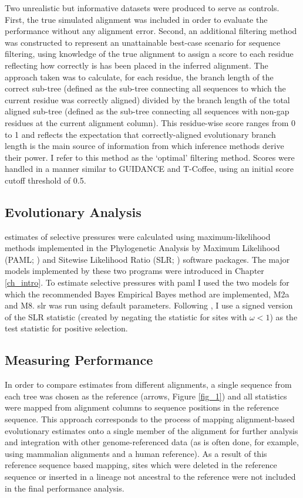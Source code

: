 Two unrealistic but informative datasets were produced to serve as
controls. First, the true simulated alignment was included in order to
evaluate the \sw performance without any alignment error. Second, an
additional filtering method was constructed to represent an
unattainable best-case scenario for sequence filtering, using
knowledge of the true alignment to assign a score to each residue
reflecting how correctly is has been placed in the inferred
alignment. The approach taken was to calculate, for each residue, the
branch length of the correct sub-tree (defined as the sub-tree
connecting all sequences to which the current residue was correctly
aligned) divided by the branch length of the total aligned sub-tree
(defined as the sub-tree connecting all sequences with non-gap
residues at the current alignment column). This residue-wise score
ranges from 0 to 1 and reflects the expectation that correctly-aligned
evolutionary branch length is the main source of information from
which \sw inference methods derive their power. I refer to this method
as the `optimal' filtering method. Scores were handled in a manner
similar to GUIDANCE and T-Coffee, using an initial score cutoff
threshold of 0.5.

\subsection{\Sw Evolutionary Analysis}

\Sw estimates of selective pressures were calculated using
maximum-likelihood methods implemented in the Phylogenetic Analysis by
Maximum Likelihood (PAML; \citealt{Yang2007}) and Sitewise
Likelihood Ratio (SLR; \citealt{Massingham2005}) software
packages. The major models implemented by these two programs were
introduced in Chapter \ref{ch_intro}. To estimate \sw selective
pressures with \ac{paml} I used the two models for which the
recommended Bayes Empirical Bayes method are implemented, M2a and
M8. \ac{slr} was run using default parameters. Following
\citet{Massingham2005}, I use a signed version of the SLR statistic
(created by negating the statistic for sites with $\omega<1$) as the
test statistic for positive selection.

\subsection{Measuring Performance}

In order to compare \sw estimates from different alignments, a single
sequence from each tree was chosen as the reference (arrows, Figure
\ref{fig_1}) and all \sw statistics were mapped from alignment columns
to sequence positions in the reference sequence. This approach
corresponds to the process of mapping alignment-based evolutionary
estimates onto a single member of the alignment for further analysis
and integration with other genome-referenced data (as is often done,
for example, using mammalian alignments and a human reference). As a
result of this reference sequence based mapping, sites which were
deleted in the reference sequence or inserted in a lineage not
ancestral to the reference were not included in the final performance
analysis.

